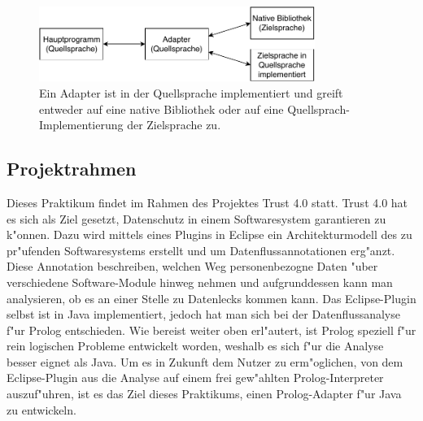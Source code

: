 \begin{figure}[h]
\centering
\includegraphics[width=0.8\textwidth]{adapter.pdf}
\caption{Ein Adapter ist in der Quellsprache implementiert und greift entweder auf eine native Bibliothek oder auf eine Quellsprach-Implementierung der Zielsprache zu.}
\label{fig:adpater}
\end{figure}

\subsection{Projektrahmen}
Dieses Praktikum findet im Rahmen des Projektes Trust 4.0\cite{trust40} statt. Trust 4.0 hat es sich als Ziel gesetzt, Datenschutz in einem Softwaresystem garantieren zu k"onnen. Dazu wird mittels eines Plugins in Eclipse ein Architekturmodell des zu pr"ufenden Softwaresystems erstellt und um Datenflussannotationen erg"anzt. Diese Annotation beschreiben, welchen Weg personenbezogne Daten "uber verschiedene Software-Module hinweg nehmen und aufgrunddessen kann man analysieren, ob es an einer Stelle zu Datenlecks kommen kann. Das Eclipse-Plugin selbst ist in Java implementiert, jedoch hat man sich bei der Datenflussanalyse f"ur Prolog entschieden.  Wie bereist weiter oben erl"autert, ist Prolog speziell f"ur rein logischen Probleme entwickelt worden, weshalb es sich f"ur die Analyse besser eignet als Java. Um es in Zukunft dem Nutzer zu erm"oglichen, von dem Eclipse-Plugin aus die Analyse auf einem frei gew"ahlten Prolog-Interpreter auszuf"uhren, ist es das Ziel dieses Praktikums, einen Prolog-Adapter f"ur Java zu entwickeln.
